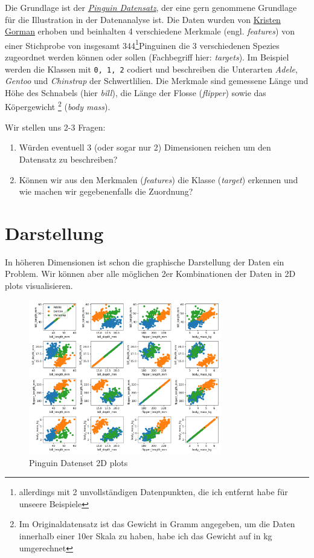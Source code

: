 \documentclass[]{book}
\providecommand{\tightlist}{%
  \setlength{\itemsep}{0pt}\setlength{\parskip}{0pt}}
\theoremstyle{definition}
\theoremstyle{definition}
\theoremstyle{definition}
\theoremstyle{definition}
\theoremstyle{remark}
\begin{document}
Die Grundlage ist der \href{https://allisonhorst.github.io/palmerpenguins/}{\emph{Pinguin Datensatz}}, der eine gern genommene Grundlage für die Illustration in der Datenanalyse ist. Die Daten wurden von \href{https://www.uaf.edu/cfos/people/faculty/detail/kristen-gorman.php}{Kristen Gorman} erhoben und beinhalten 4 verschiedene Merkmale (engl. \emph{features}) von einer Stichprobe von insgesamt 344\footnote{allerdings mit 2 unvollständigen Datenpunkten, die ich entfernt habe für unseere Beispiele}Pinguinen die 3 verschiedenen Spezies zugeordnet werden können oder sollen (Fachbegriff hier: \emph{targets}). Im Beispiel werden die Klassen mit \texttt{0,\ 1,\ 2} codiert und beschreiben die Unterarten \emph{Adele}, \emph{Gentoo} und \emph{Chinstrap} der Schwertlilien. Die Merkmale sind gemessene Länge und Höhe des Schnabels (hier \emph{bill}), die Länge der Flosse (\emph{flipper}) sowie das Köpergewicht \footnote{Im Originaldatensatz ist das Gewicht in Gramm angegeben, um die Daten innerhalb einer 10er Skala zu haben, habe ich das Gewicht auf in kg umgerechnet}
(\emph{body mass}).

Wir stellen uns 2-3 Fragen:

\begin{enumerate}
\def\labelenumi{\arabic{enumi}.}
\tightlist
\item
  Würden eventuell 3 (oder sogar nur 2) Dimensionen reichen um den Datensatz zu beschreiben?
\item
  Können wir aus den Merkmalen (\emph{features}) die Klasse (\emph{target}) erkennen und wie machen wir gegebenenfalls die Zuordnung?
\end{enumerate}

\hypertarget{darstellung}{%
\section{Darstellung}\label{darstellung}}

In höheren Dimensionen ist schon die graphische Darstellung der Daten ein Problem. Wir können aber alle möglichen 2er Kombinationen der Daten in 2D plots visualisieren.

\begin{figure}
\hypertarget{fig:05-penguin-allpairs}{%
\centering
\includegraphics[width=0.75\textwidth,height=\textheight]{bilder/05-all-pairs.png}
\caption{Pinguin Datenset 2D plots}\label{fig:05-penguin-allpairs}
}
\end{figure}
\end{document}
